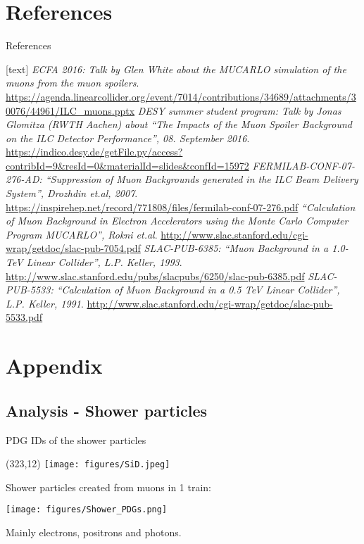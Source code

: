 \documentclass[xcolor={dvipsnames}]{beamer}
\newcommand{\sidlogo}{
  \setlength{\TPHorizModule}{1pt}
  \setlength{\TPVertModule}{1pt}
  \begin{textblock}{1}(323,12)
   \texttt{[image: figures/SiD.jpeg]}
  \end{textblock}
  }
\begin{document}
\section{References}
\begin{frame}{References}
\tiny
\begin{thebibliography}{9}
[text]
  \emph{ECFA 2016: Talk by Glen White about the MUCARLO simulation of the muons from the muon spoilers}. \url{https://agenda.linearcollider.org/event/7014/contributions/34689/attachments/30076/44961/ILC_muons.pptx}
  \emph{DESY summer student program: Talk by Jonas Glomitza (RWTH Aachen) about ``The Impacts of the Muon Spoiler Background on the ILC Detector Performance'', 08. September 2016}. \url{https://indico.desy.de/getFile.py/access?contribId=9&resId=0&materialId=slides&confId=15972}
  \emph{FERMILAB-CONF-07-276-AD: ``Suppression of Muon Backgrounds generated in the ILC Beam Delivery System'', Drozhdin et.al, 2007}. \url{https://inspirehep.net/record/771808/files/fermilab-conf-07-276.pdf}
  \emph{``Calculation of Muon Background in Electron Accelerators using the Monte Carlo Computer Program MUCARLO'', Rokni et.al}. \url{http://www.slac.stanford.edu/cgi-wrap/getdoc/slac-pub-7054.pdf}
  \emph{SLAC-PUB-6385: ``Muon Background in a 1.0-TeV Linear Collider'', L.P. Keller, 1993}. \url{http://www.slac.stanford.edu/pubs/slacpubs/6250/slac-pub-6385.pdf}
  \emph{SLAC-PUB-5533: ``Calculation of Muon Background in a 0.5 TeV Linear Collider'', L.P. Keller, 1991}. \url{http://www.slac.stanford.edu/cgi-wrap/getdoc/slac-pub-5533.pdf}
\end{thebibliography}
\end{frame}
\section*{Appendix}
\subsection*{Analysis - Shower particles}
\begin{frame}{PDG IDs of the shower particles}
\sidlogo
Shower particles created from muons in 1 train:
 \begin{center}
\texttt{[image: figures/Shower\_PDGs.png]}
\end{center}
Mainly electrons, positrons and photons.
\end{frame}
\end{document}
